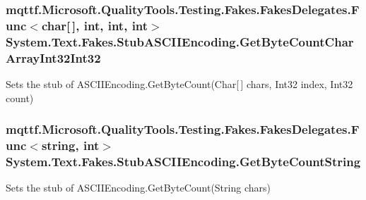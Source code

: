 \hypertarget{class_system_1_1_text_1_1_fakes_1_1_stub_a_s_c_i_i_encoding_a0f6bff8d3d34a35a9309973bb8614ccb}{
\subsubsection[{Get\-Byte\-Count\-Char\-Array\-Int32\-Int32}]{\setlength{\rightskip}{0pt plus 5cm}mqttf.\-Microsoft.\-Quality\-Tools.\-Testing.\-Fakes.\-Fakes\-Delegates.\-Func$<$char\mbox{[}$\,$\mbox{]}, int, int, int$>$ System.\-Text.\-Fakes.\-Stub\-A\-S\-C\-I\-I\-Encoding.\-Get\-Byte\-Count\-Char\-Array\-Int32\-Int32}}\label{class_system_1_1_text_1_1_fakes_1_1_stub_a_s_c_i_i_encoding_a0f6bff8d3d34a35a9309973bb8614ccb}


Sets the stub of A\-S\-C\-I\-I\-Encoding.\-Get\-Byte\-Count(\-Char\mbox{[}$\,$\mbox{]} chars, Int32 index, Int32 count)

\hypertarget{class_system_1_1_text_1_1_fakes_1_1_stub_a_s_c_i_i_encoding_accee292e7ea8b241a7cc536091ad1ced}{
\subsubsection[{Get\-Byte\-Count\-String}]{\setlength{\rightskip}{0pt plus 5cm}mqttf.\-Microsoft.\-Quality\-Tools.\-Testing.\-Fakes.\-Fakes\-Delegates.\-Func$<$string, int$>$ System.\-Text.\-Fakes.\-Stub\-A\-S\-C\-I\-I\-Encoding.\-Get\-Byte\-Count\-String}}\label{class_system_1_1_text_1_1_fakes_1_1_stub_a_s_c_i_i_encoding_accee292e7ea8b241a7cc536091ad1ced}


Sets the stub of A\-S\-C\-I\-I\-Encoding.\-Get\-Byte\-Count(\-String chars)


